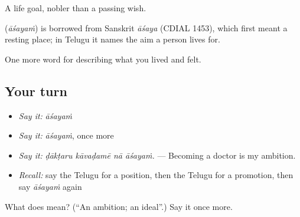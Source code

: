 A life goal, nobler than a passing wish.

\begin{cousinweb}
\textbf{} (\emph{āśayaṁ}) is borrowed from Sanskrit \emph{āśaya} (CDIAL 1453), which first meant a resting place; in Telugu it names the aim a person lives for.
\end{cousinweb}

\begin{grammarlens}[title={What you've built}]
One more word for describing what you lived and felt.
\end{grammarlens}

\subsection*{Your turn}
\begin{itemize}
\raggedright
  \item \emph{Say it:} \emph{āśayaṁ}
  \item \emph{Say it:} \emph{āśayaṁ}, once more
  \item \emph{Say it:} \emph{ḍākṭaru kāvaḍamē nā āśayaṁ.} — Becoming a doctor is my ambition.
  \item \emph{Recall:} say the Telugu for a position, then the Telugu for a promotion, then say \emph{āśayaṁ} again
\end{itemize}

\begin{tcolorbox}[breakable,colback=teal!4,colframe=teal!35!black,title={Before you move on}]
What does  mean? (\textquotedblleft{}An ambition; an ideal\textquotedblright{}.) Say it once more.
\end{tcolorbox}
